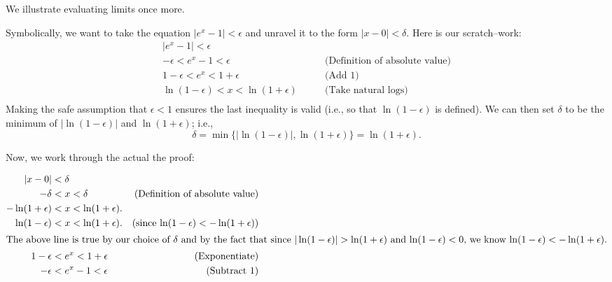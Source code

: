 We illustrate evaluating limits once more.\\

{Symbolically, we want to take the equation $|e^x - 1| < \epsilon$ and unravel it to the form $|x-0| < \delta$.  Here is our scratch--work:
\begin{eqnarray*}
|e^x - 1| < \epsilon&\\
-\epsilon < e^x - 1 < \epsilon& \qquad \textrm{(Definition of absolute value)}\\
1-\epsilon < e^x < 1+\epsilon & \qquad \textrm{(Add 1)}\\
\ln(1-\epsilon) < x < \ln(1+\epsilon) & \qquad \textrm{(Take natural logs)}\\
\end{eqnarray*}
Making the safe assumption that $\epsilon<1$ ensures the last inequality is valid (i.e., so that $\ln (1-\epsilon)$ is defined). We can then set $\delta$ to be the minimum of $|\ln(1-\epsilon)|$ and $\ln(1+\epsilon)$; i.e.,  %
$$\delta = \min\{|\ln(1-\epsilon)|, \ln(1+\epsilon)\} = \ln(1+\epsilon).$$  

Now, we work through the actual the proof:


\begin{align*}
|x - 0|&<\delta\\
-\delta &< x < \delta &  \textrm{(Definition of absolute value)}\\
-\ln(1+\epsilon) &< x < \ln(1+\epsilon). &\\  
\ln(1-\epsilon) &< x < \ln(1+\epsilon). & \text{(since $\ln(1-\epsilon) < -\ln(1+\epsilon)$)}\\ 
\intertext{The above line is true by our choice of $\delta$ and by the fact that since $|\ln(1-\epsilon)|>\ln(1+\epsilon)$ and $\ln(1-\epsilon)<0$, we know $\ln(1-\epsilon) < -\ln(1+\epsilon )$.} %
1-\epsilon &< e^x < 1+\epsilon &  \textrm{(Exponentiate)}\\
-\epsilon &< e^x - 1 < \epsilon &  \textrm{(Subtract 1)}\\
\end{align*}

}
